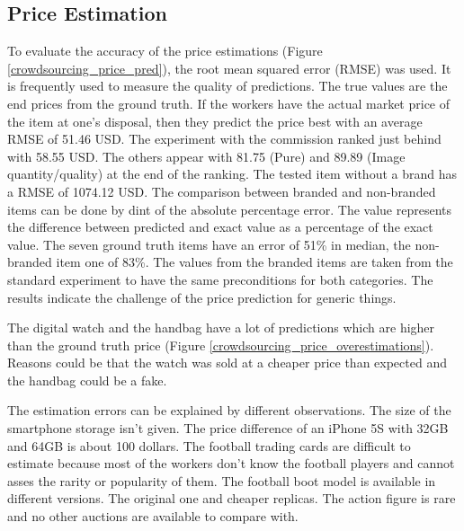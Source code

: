 \subsection{Price Estimation}
To evaluate the accuracy of the price estimations (Figure \ref{crowdsourcing_price_pred}), the root mean squared error (RMSE) was used. It is frequently used to measure the quality of predictions. The true values are the end prices from the ground truth. If the workers have the actual market price of the item at one's disposal, then they predict the price best with an average RMSE of 51.46 USD. The experiment with the commission ranked just behind with 58.55 USD. The others appear with 81.75 (Pure) and 89.89 (Image quantity/quality) at the end of the ranking. The tested item without a brand has a RMSE of 1074.12 USD. The comparison between branded and non-branded items can be done by dint of the absolute percentage error. The value represents the difference between predicted and exact value as a percentage of the exact value. The seven ground truth items have an error of 51\% in median, the non-branded item one of 83\%. The values from the branded items are taken from the standard experiment to have the same preconditions for both categories. The results indicate the challenge of the price prediction for generic things.

The digital watch and the handbag have a lot of predictions which are higher than the ground truth price (Figure \ref{crowdsourcing_price_overestimations}). Reasons could be that the watch was sold at a cheaper price than expected and the handbag could be a fake.

The estimation errors can be explained by different observations. The size of the smartphone storage isn't given. The price difference of an iPhone 5S with 32GB and 64GB is about 100 dollars. The football trading cards are difficult to estimate because most of the workers don't know the football players and cannot asses the rarity or popularity of them. The football boot model is available in different versions. The original one and cheaper replicas. The action figure is rare and no other auctions are available to compare with.

